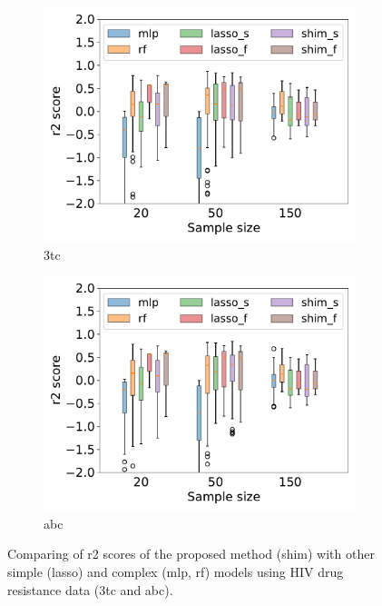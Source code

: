\documentclass{article}
\begin{document}
\begin{figure}[h!]
\begin{subfigure}{0.4\textwidth}
\centering
    \includegraphics[width=\textwidth]{figures/r2_3tc_20_50_150_.pdf}
    \caption{3tc}
    \label{fig:1}
\end{subfigure}
\hfill
\begin{subfigure}{0.4\textwidth}
\centering
    \includegraphics[width=\textwidth]{figures/r2_abc_20_50_150_.pdf}
     \caption{abc}
    \label{fig:2}
\end{subfigure}
\caption{Comparing of r2 scores of the proposed method (shim) with other simple (lasso) and complex (mlp, rf) models using HIV drug resistance data (3tc and abc).}
\end{figure}
\end{document}
